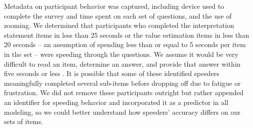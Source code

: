 \documentclass{IEEEcsmag}
\begin{document}
Metadata on participant behavior was captured, including device used to complete the survey and time spent on each set of questions, and the use of zooming. We determined that participants who completed the interpretation statement items in less than 25 seconds or the value estimation items in less than 20 seconds -- an assumption of spending less than or equal to 5 seconds per item in the set -- were speeding through the questions. We assume it would be very difficult to read an item, determine an answer, and provide that answer within five seconds or less . It is possible that some of these identified speeders meaningfully completed several sub-items before dropping off due to fatigue or frustration. We did not remove these participants outright but rather appended an identifier for speeding behavior and incorporated it as a predictor in all modeling, so we could better understand how speeders' accuracy differs on our sets of items.
\end{document}
